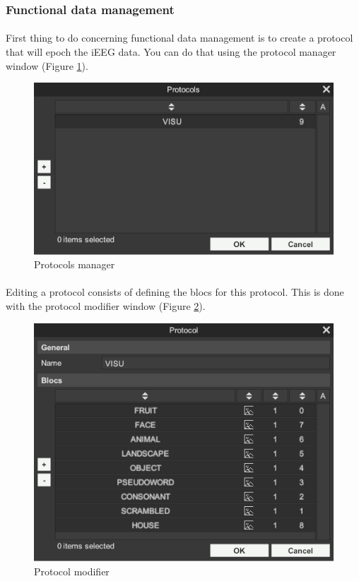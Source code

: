 \documentclass[a4paper]{article}
\begin{document}
\subsubsection{Functional data management}
\paragraph{} First thing to do concerning functional data management is to create a protocol that will epoch the iEEG data. You can do that using the protocol manager window (Figure \ref{protocolGestionUI}).
\begin{figure}[H]
\begin{center}
\includegraphics[scale=0.5]{ProtocolGestion.png}
\end{center}
\caption{\label{protocolGestionUI}Protocols manager}
\end{figure}
\paragraph{} Editing a protocol consists of defining the blocs for this protocol. This is done with the protocol modifier window (Figure \ref{protocolModifierUI}).
\begin{figure}[H]
\begin{center}
\includegraphics[scale=0.5]{ProtocolModifier.png}
\end{center}
\caption{\label{protocolModifierUI}Protocol modifier}
\end{figure}
\end{document}
